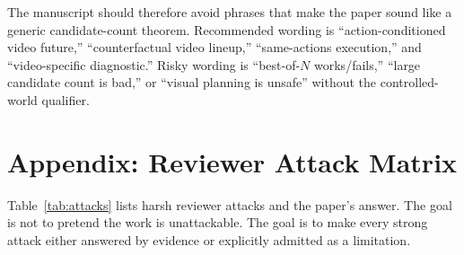 \documentclass{article}
\begin{document}
The manuscript should therefore avoid phrases that make the paper sound like a generic candidate-count theorem. Recommended wording is ``action-conditioned video future,'' ``counterfactual video lineup,'' ``same-actions execution,'' and ``video-specific diagnostic.'' Risky wording is ``best-of-\(N\) works/fails,'' ``large candidate count is bad,'' or ``visual planning is unsafe'' without the controlled-world qualifier.

\section{Appendix: Reviewer Attack Matrix}
\label{app:reviewer-matrix}

Table~\ref{tab:attacks} lists harsh reviewer attacks and the paper's answer. The goal is not to pretend the work is unattackable. The goal is to make every strong attack either answered by evidence or explicitly admitted as a limitation.
\end{document}
